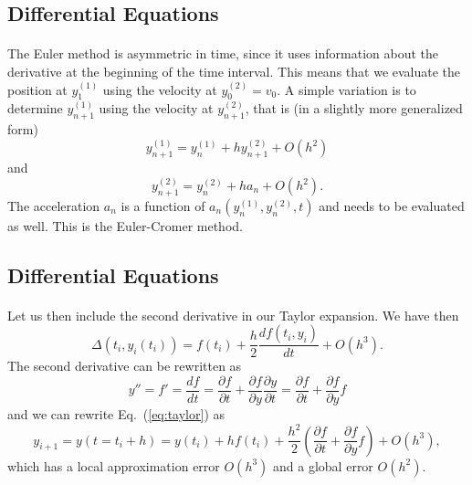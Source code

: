 \documentclass[%
oneside,                 %
final,                   %
10pt]{article}
\begin{document}
\subsection*{Differential Equations}

\paragraph{}
The Euler method is asymmetric in time, since it uses information about the derivative at the beginning
of the time interval. This means that we evaluate the position at $y^{(1)}_1$ using the velocity
at $y^{(2)}_0=v_0$. A simple variation is to determine $y^{(1)}_{n+1}$ using the velocity at
$y^{(2)}_{n+1}$, that is (in a slightly more generalized form)
\begin{equation} 
   y^{(1)}_{n+1}=y^{(1)}_{n}+h y^{(2)}_{n+1}+O(h^2)
\end{equation}
and 
\begin{equation}
   y^{(2)}_{n+1}=y^{(2)}_{n}+h a_{n}+O(h^2).
\end{equation}
The acceleration $a_n$ is a function of $a_n(y^{(1)}_{n}, y^{(2)}_{n},t)$ and needs to be evaluated
as well. This is the Euler-Cromer method.




\subsection*{Differential Equations}

\paragraph{}
Let us then include the second derivative in our Taylor expansion. 
We have then
\begin{equation}
 \Delta(t_i,y_i(t_i))=f(t_i)+\frac{h}{2}\frac{df(t_i,y_i)}{dt}+O(h^3).
\end{equation}
The second derivative can be rewritten as
\begin{equation}
  y''=f'=\frac{df}{dt}=\frac{\partial f}{\partial t}+\frac{\partial f}{\partial y}\frac{\partial y}{\partial t}=\frac{\partial f}{\partial t}+\frac{\partial f}{\partial y}f \label{eq:derivatives}
\end{equation}
and we can rewrite Eq.\ (\ref{eq:taylor}) as 
\begin{equation}
     y_{i+1}=y(t=t_i+h)=y(t_i) +hf(t_i)+
     \frac{h^2}{2}\left(\frac{\partial f}{\partial t}+\frac{\partial f}{\partial y}f\right) + O(h^{3  }),
\end{equation}
which has a local approximation error $O(h^{3  })$ and a global
error $O(h^{2})$.
\end{document}
